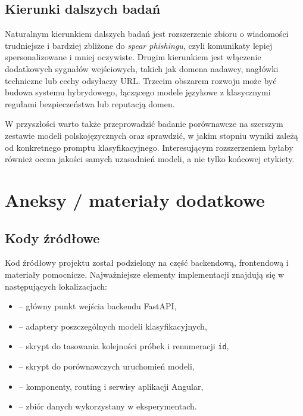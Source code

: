 \documentclass[12pt,a4paper,openright]{report}
\begin{document}
\section{Kierunki dalszych badań}

Naturalnym kierunkiem dalszych badań jest rozszerzenie zbioru o wiadomości trudniejsze i bardziej zbliżone do \textit{spear phishingu}, czyli komunikaty lepiej spersonalizowane i mniej oczywiste. Drugim kierunkiem jest włączenie dodatkowych sygnałów wejściowych, takich jak domena nadawcy, nagłówki techniczne lub cechy odsyłaczy URL. Trzecim obszarem rozwoju może być budowa systemu hybrydowego, łączącego modele językowe z klasycznymi regułami bezpieczeństwa lub reputacją domen.

W przyszłości warto także przeprowadzić badanie porównawcze na szerszym zestawie modeli polskojęzycznych oraz sprawdzić, w jakim stopniu wyniki zależą od konkretnego promptu klasyfikacyjnego. Interesującym rozszerzeniem byłaby również ocena jakości samych uzasadnień modeli, a nie tylko końcowej etykiety.

\printbibliography[heading=bibnumbered,title={Bibliografia}]

\chapter{Aneksy / materiały dodatkowe}

\section{Kody źródłowe}

Kod źródłowy projektu został podzielony na część backendową, frontendową i materiały pomocnicze. Najważniejsze elementy implementacji znajdują się w następujących lokalizacjach:

\begin{itemize}
    \item {} -- główny punkt wejścia backendu FastAPI,
    \item {} -- adaptery poszczególnych modeli klasyfikacyjnych,
    \item {} -- skrypt do tasowania kolejności próbek i renumeracji \texttt{id},
    \item {} -- skrypt do porównawczych uruchomień modeli,
    \item {} -- komponenty, routing i serwisy aplikacji Angular,
    \item {} -- zbiór danych wykorzystany w eksperymentach.
\end{itemize}
\end{document}
